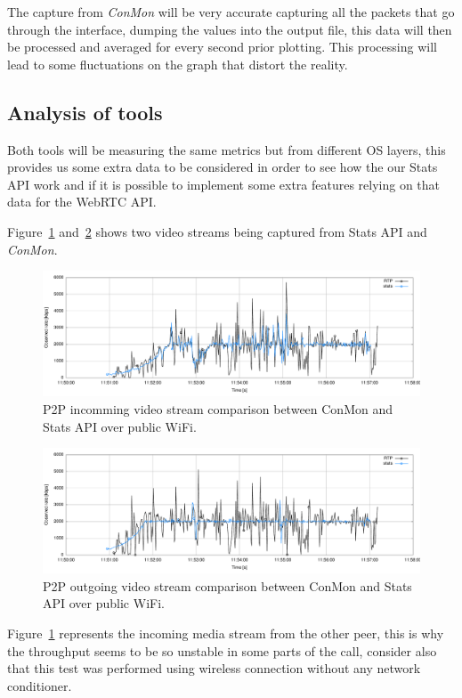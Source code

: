 The capture from {\it ConMon} will be very accurate capturing all the packets that go through the interface, dumping the values into the output file, this data will then be processed and averaged for every second prior plotting. This processing will lead to some fluctuations on the graph that distort the reality.

\subsection{Analysis of tools}

Both tools will be measuring the same metrics but from different OS layers, this provides us some extra data to be considered in order to see how the our Stats API work and if it is possible to implement some extra features relying on that data for the WebRTC API.

Figure~\ref{fig:p2pincommingStatsConmonWifi} and~\ref{fig:p2poutgoingStatsConmonWifi} shows two video streams being captured from Stats API and {\it ConMon}.

 \begin{figure}[h]
  \centering
    \includegraphics[width=1\textwidth]{./figures/p2pincommingStatsConmonWifi.pdf}
      \caption[P2P incoming video stream comparison between ConMon and Stats API over public WiFi]{P2P incomming video stream comparison between ConMon and Stats API over public WiFi.}
	\label{fig:p2pincommingStatsConmonWifi}
\end{figure}

\begin{figure}[h]
  \centering
    \includegraphics[width=1\textwidth]{./figures/p2poutgoingStatsConmonWifi.pdf}
      \caption[P2P outgoing video stream comparison between ConMon and Stats API over public WiFi]{P2P outgoing video stream comparison between ConMon and Stats API over public WiFi.}
	\label{fig:p2poutgoingStatsConmonWifi}
\end{figure}

Figure~\ref{fig:p2pincommingStatsConmonWifi} represents the incoming media stream from the other peer, this is why the throughput seems to be so unstable in some parts of the call, consider also that this test was performed using wireless connection without any network conditioner. 

